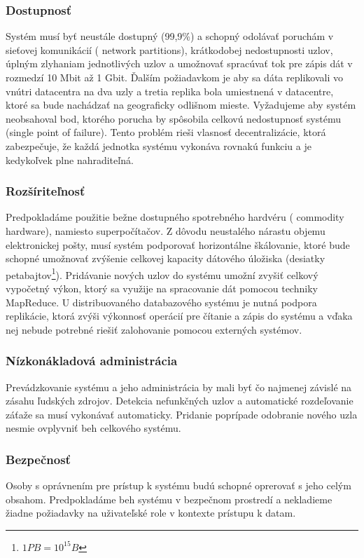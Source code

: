 \documentclass[11pt,twoside,a4paper]{book}
\begin{document}
\subsubsection*{Dostupnosť}
Systém musí byť neustále dostupný (99,9\%) a schopný odolávať poruchám v sieťovej komunikácií ( network partitions), krátkodobej nedostupnosti uzlov, úplným zlyhaniam jednotlivých uzlov a umožnovať spracúvať tok pre zápis dát v rozmedzí 10 Mbit až 1 Gbit. Ďalším požiadavkom je aby sa dáta replikovali vo vnútri datacentra na dva uzly a tretia replika bola umiestnená v datacentre, ktoré sa bude nachádzať na geograficky odlišnom mieste. Vyžadujeme aby systém neobsahoval bod, ktorého porucha by spôsobila celkovú nedostupnosť systému (single point of failure). Tento problém rieši vlasnosť decentralizácie, ktorá zabezpečuje, že každá jednotka systému vykonáva rovnakú funkciu a je kedykoľvek plne nahraditeľná.

\subsubsection*{Rozšíriteľnosť}
Predpokladáme použitie bežne dostupného spotrebného hardvéru ( commodity hardware), namiesto superpočítačov. Z dôvodu neustalého nárastu objemu elektronickej pošty, musí systém podporovať horizontálne škálovanie, ktoré bude schopné umožnovať zvýšenie celkovej kapacity dátového úložiska (desiatky petabajtov\footnote{$ 1PB = 10^{15} B$}). Pridávanie nových uzlov do systému umožní zvyšiť celkový vypočetný výkon, ktorý sa využije na spracovanie dát pomocou techniky MapReduce. U distribuovaného databazového systému je nutná podpora replikácie, ktorá zvýši výkonnosť operácií pre čítanie a zápis do systému a vďaka nej nebude potrebné riešiť zalohovanie pomocou externých systémov.

\subsubsection*{Nízkonákladová administrácia}
Prevádzkovanie systému a jeho administrácia by mali byť čo najmenej závislé na zásahu ľudských zdrojov. Detekcia nefunkčných uzlov a automatické rozdeľovanie záťaže sa musí vykonávať automaticky. Pridanie poprípade odobranie nového uzla nesmie ovplyvniť beh celkového systému.

\subsubsection*{Bezpečnosť}
Osoby s oprávnením pre prístup k systému budú schopné oprerovať s jeho celým obsahom. Predpokladáme beh systému v bezpečnom prostredí a nekladieme žiadne požiadavky na uživateľské role v kontexte prístupu k datam.
\end{document}
